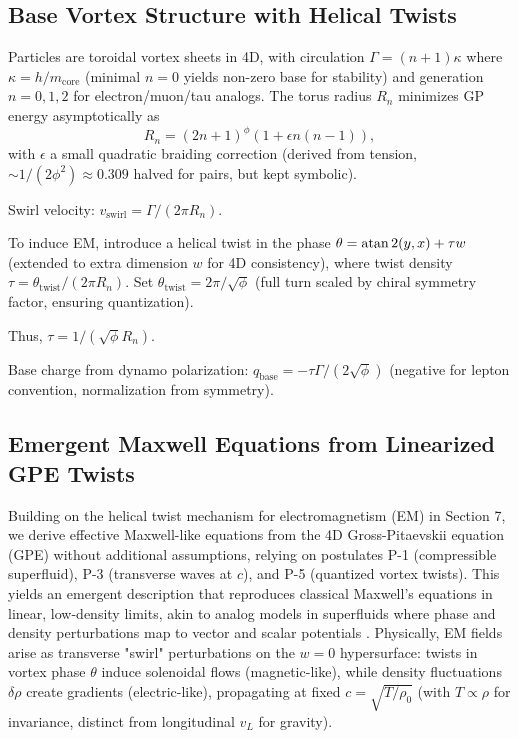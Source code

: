 \documentclass{article}
\begin{document}
\subsection{Base Vortex Structure with Helical Twists}

Particles are toroidal vortex sheets in 4D, with circulation $\Gamma = (n + 1) \kappa$ where $\kappa = h / m_{\text{core}}$ (minimal $n=0$ yields non-zero base for stability) and generation $n=0,1,2$ for electron/muon/tau analogs. The torus radius $R_n$ minimizes GP energy asymptotically as
\[
R_n = (2n + 1)^\phi \left(1 + \epsilon n (n-1)\right),
\]
with $\epsilon$ a small quadratic braiding correction (derived from tension, $\sim 1/(2\phi^2) \approx 0.309$ halved for pairs, but kept symbolic).

Swirl velocity: $v_{\text{swirl}} = \Gamma / (2\pi R_n)$.

To induce EM, introduce a helical twist in the phase $\theta = \atan2(y,x) + \tau w$ (extended to extra dimension $w$ for 4D consistency), where twist density $\tau = \theta_{\text{twist}} / (2\pi R_n)$. Set $\theta_{\text{twist}} = 2\pi / \sqrt{\phi}$ (full turn scaled by chiral symmetry factor, ensuring quantization).

Thus, $\tau = 1 / (\sqrt{\phi} R_n)$.

Base charge from dynamo polarization: $q_{\text{base}} = - \tau \Gamma / (2 \sqrt{\phi})$ (negative for lepton convention, normalization from symmetry).

\subsection{Emergent Maxwell Equations from Linearized GPE Twists}

Building on the helical twist mechanism for electromagnetism (EM) in Section 7, we derive effective Maxwell-like equations from the 4D Gross-Pitaevskii equation (GPE) without additional assumptions, relying on postulates P-1 (compressible superfluid), P-3 (transverse waves at \(c\)), and P-5 (quantized vortex twists). This yields an emergent description that reproduces classical Maxwell's equations in linear, low-density limits, akin to analog models in superfluids where phase and density perturbations map to vector and scalar potentials \cite{unruh1981experimental, visser1998acoustic}. Physically, EM fields arise as transverse "swirl" perturbations on the \(w=0\) hypersurface: twists in vortex phase \(\theta\) induce solenoidal flows (magnetic-like), while density fluctuations \(\delta \rho\) create gradients (electric-like), propagating at fixed \(c = \sqrt{T / \rho_0}\) (with \(T \propto \rho\) for invariance, distinct from longitudinal \(v_L\) for gravity).
\end{document}
